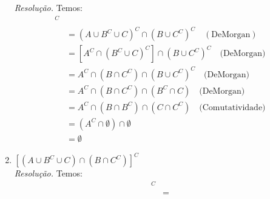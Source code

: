 \begin{enumerate}
    \emph{Resolução.} Temos:
    \begin{align*}
        [(A &\cup B^C \cup C) \cup (B \cup C^C)]^C \\ &=
        (A \cup B^C \cup C)^C \cap (B \cup C^C)^C \quad (\text{DeMorgan}) \\ &=
        [A^C \cap (B^C \cup C)^C] \cap (B \cup C^C)^C \quad \text{(DeMorgan)} \\ &=
        A^C \cap (B \cap C^C) \cap (B \cup C^C)^C \quad \text{(DeMorgan)} \\ &=
        A^C \cap (B \cap C^C) \cap (B^C \cap C) \quad \text{(DeMorgan)} \\ &= 
        A^C \cap (B \cap B^C) \cap (C \cap C^C) \quad \text{(Comutatividade)} \\ &=
        (A^C \cap \emptyset) \cap \emptyset \\ &=
        \emptyset
    \end{align*}
    \item $[(A \cup B^C \cup C) \cap (B \cap C^C)]^C$
    \\ 
    \emph{Resolução.} Temos:
    \begin{align*}
        [(A &\cup B^C \cup C) \cap (B \cap C^C)]^C \\ & =
    \end{align*}
\end{enumerate}